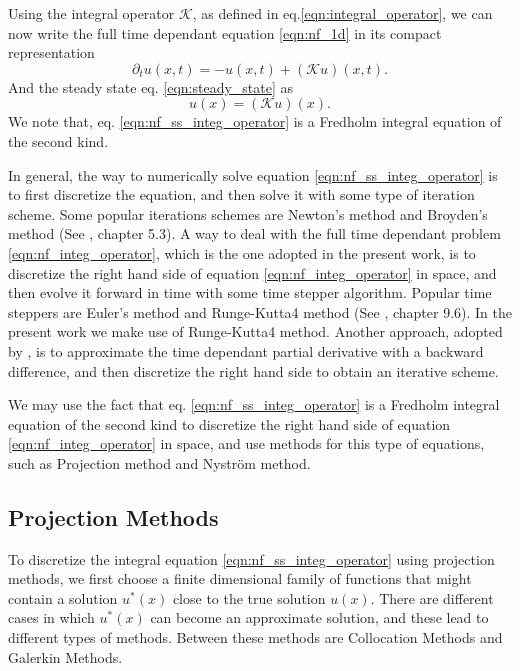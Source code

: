 \documentclass{uonmathreport}
\begin{document}
Using the integral operator $\mathcal{K}$, as defined in eq.\ref{eqn:integral_operator}, we can now write the full time dependant equation \ref{eqn:nf_1d} in its compact representation
\begin{equation}\label{eqn:nf_integ_operator}
\partial_t u(x,t) = -u(x,t) + (\mathcal{K}u)(x,t).
\end{equation}
And the steady state eq. \ref{eqn:steady_state} as
\begin{equation}\label{eqn:nf_ss_integ_operator}
u(x) = (\mathcal{K}u)(x).
\end{equation}
We note that, eq. \ref{eqn:nf_ss_integ_operator} is a Fredholm integral equation of the second kind.

In general, the way to numerically solve equation \ref{eqn:nf_ss_integ_operator} is to first discretize the equation, and then solve it with some type of iteration scheme. Some popular iterations schemes are Newton's method and Broyden's method (See \cite{heath2002scientific}, chapter 5.3). A way to deal with the full time dependant problem \ref{eqn:nf_integ_operator}, which is the one adopted in the present work, is to discretize the right hand side of equation \ref{eqn:nf_integ_operator} in space, and then evolve it forward in time with some time stepper algorithm. Popular time steppers are Euler's method and Runge-Kutta4 method (See \cite{heath2002scientific}, chapter 9.6). In the present work we make use of Runge-Kutta4 method. Another approach, adopted by \cite{lima2015numerical}, is to approximate the time dependant partial derivative with a backward difference, and then discretize the right hand side to obtain an iterative scheme.

We may use the fact that eq. \ref{eqn:nf_ss_integ_operator} is a Fredholm integral equation of the second kind to discretize the right hand side of equation \ref{eqn:nf_integ_operator} in space, and use methods for this type of equations, such as Projection method and Nystr\"om method.

\subsection{Projection Methods}
\label{subsec:projection_methods}
To discretize the integral equation \ref{eqn:nf_ss_integ_operator} using projection methods, we first choose a finite dimensional family of functions that might contain a solution $u^*(x)$ close to the true solution $u(x)$. There are different cases in which $u^*(x)$ can become an approximate solution, and these lead to different types of methods. Between these methods are Collocation Methods and Galerkin Methods.
\end{document}
